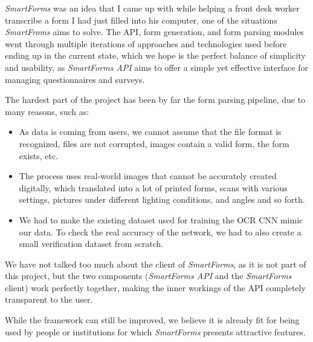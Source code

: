 \documentclass[11pt, a4paper]{report}
\begin{document}
\textit{SmartForms} was an idea that I came up with while helping a front desk worker transcribe a form I had just filled into his computer, one of the situations \textit{SmartFroms} aims to solve. The API, form generation, and form parsing modules went through multiple iterations of approaches and technologies used before ending up in the current state, which we hope is the perfect balance of simplicity and usability, as \textit{SmartForms API} aims to offer a simple yet effective interface for managing questionnaires and surveys.

The hardest part of the project has been by far the form parsing pipeline, due to many reasons, such as:
\begin{itemize}
	\item As data is coming from users, we cannot assume that the file format is recognized, files are not corrupted, images contain a valid form, the form exists, etc.
	\item The process uses real-world images that cannot be accurately created digitally, which translated into a lot of printed forms, scans with various settings, pictures under different lighting conditions, and angles and so forth.
	\item We had to make the existing dataset used for training the OCR CNN mimic our data. To check the real accuracy of the network, we had to also create a small verification dataset from scratch.
\end{itemize}

We have not talked too much about the client of \textit{SmartForms}, as it is not part of this project, but the two components (\textit{SmartForms API} and the \textit{SmartForms} client) work perfectly together, making the inner workings of the API completely transparent to the user.


While the framework can still be improved, we believe it is already fit for being used by people or institutions for which \textit{SmartForms} presents attractive features.
\end{document}
